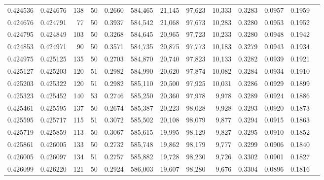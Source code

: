 \begin{tabular}{rrrrrrrrrrrrr}
0.424536 & 0.424676 &   138 &  50 &                                     0.2660 & 584,465 &  21,145 &  97,623 &  10,333 & 0.3283 & 0.0957 & 0.1959 \\
0.424676 & 0.424791 &    77 &  50 &                                     0.3937 & 584,542 &  21,068 &  97,673 &  10,283 & 0.3280 & 0.0953 & 0.1952 \\
0.424795 & 0.424849 &   103 &  50 &                                     0.3268 & 584,645 &  20,965 &  97,723 &  10,233 & 0.3280 & 0.0948 & 0.1942 \\
0.424853 & 0.424971 &    90 &  50 &                                     0.3571 & 584,735 &  20,875 &  97,773 &  10,183 & 0.3279 & 0.0943 & 0.1934 \\
0.424975 & 0.425125 &   135 &  50 &                                     0.2703 & 584,870 &  20,740 &  97,823 &  10,133 & 0.3282 & 0.0939 & 0.1921 \\
0.425127 & 0.425203 &   120 &  51 &                                     0.2982 & 584,990 &  20,620 &  97,874 &  10,082 & 0.3284 & 0.0934 & 0.1910 \\
0.425203 & 0.425322 &   120 &  51 &                                     0.2982 & 585,110 &  20,500 &  97,925 &  10,031 & 0.3286 & 0.0929 & 0.1899 \\
0.425323 & 0.425452 &   140 &  53 &                                     0.2746 & 585,250 &  20,360 &  97,978 &   9,978 & 0.3289 & 0.0924 & 0.1886 \\
0.425461 & 0.425595 &   137 &  50 &                                     0.2674 & 585,387 &  20,223 &  98,028 &   9,928 & 0.3293 & 0.0920 & 0.1873 \\
0.425595 & 0.425717 &   115 &  51 &                                     0.3072 & 585,502 &  20,108 &  98,079 &   9,877 & 0.3294 & 0.0915 & 0.1863 \\
0.425719 & 0.425859 &   113 &  50 &                                     0.3067 & 585,615 &  19,995 &  98,129 &   9,827 & 0.3295 & 0.0910 & 0.1852 \\
0.425861 & 0.426005 &   133 &  50 &                                     0.2732 & 585,748 &  19,862 &  98,179 &   9,777 & 0.3299 & 0.0906 & 0.1840 \\
0.426005 & 0.426097 &   134 &  51 &                                     0.2757 & 585,882 &  19,728 &  98,230 &   9,726 & 0.3302 & 0.0901 & 0.1827 \\
0.426099 & 0.426220 &   121 &  50 &                                     0.2924 & 586,003 &  19,607 &  98,280 &   9,676 & 0.3304 & 0.0896 & 0.1816 \\

\end{tabular}
